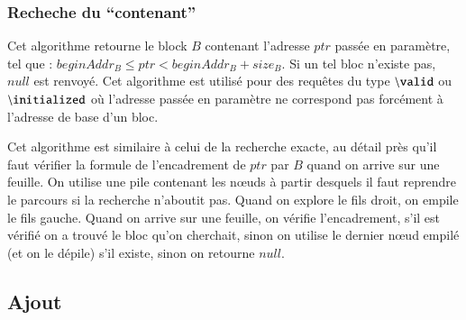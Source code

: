 \documentclass[french]{spimufcphdthesis}
\begin{document}
\subsubsection{Recheche du ``contenant''}

Cet algorithme retourne le block $B$ contenant l'adresse $ptr$ passée en
paramètre, tel que : $beginAddr_B \le ptr < beginAddr_B + size_B$. Si un tel
bloc n'existe pas, $null$ est renvoyé. Cet algorithme est utilisé pour des
requêtes du type ${\tt \backslash valid}$ ou ${\tt \backslash initialized}$ où
l'adresse passée en paramètre ne correspond pas forcément à l'adresse de base
d'un bloc.

Cet algorithme est similaire à celui de la recherche exacte, au détail près
qu'il faut vérifier la formule de l'encadrement de $ptr$ par $B$ quand on arrive
sur une feuille. On utilise une pile contenant les n\oe{}uds à partir desquels
il
faut reprendre le parcours si la recherche n'aboutit pas. Quand on explore le
fils droit, on empile le fils gauche. Quand on arrive sur une feuille, on
vérifie l'encadrement, s'il est vérifié on a trouvé le bloc qu'on cherchait,
sinon on utilise le dernier n\oe{}ud empilé (et on le dépile) s'il existe, sinon
on retourne $null$.

\subsection{Ajout}
\end{document}

